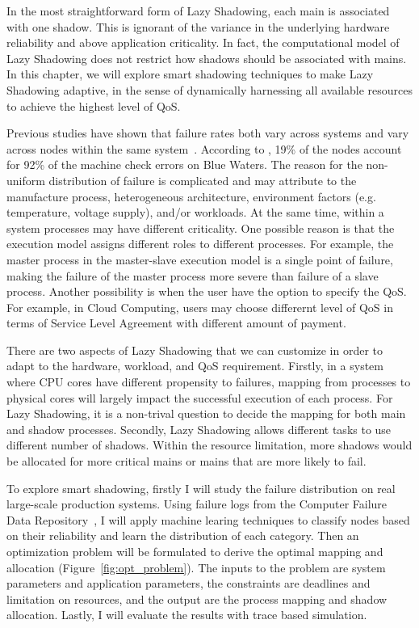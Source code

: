 In the most straightforward form of Lazy Shadowing, each main is associated with one shadow. This is ignorant of the variance in the underlying hardware reliability and above application criticality. In fact, the computational model of Lazy Shadowing does not restrict how shadows should be associated with mains. In this chapter, we will explore smart shadowing techniques to make Lazy Shadowing adaptive, in the sense of dynamically harnessing all available resources to achieve the highest level of QoS. 

Previous studies have shown that failure rates both vary across systems and vary across nodes within the same system~\cite{schroeder2007,di2014lessons}. According to \cite{di2014lessons}, 19\% of the nodes account for 92\% of the machine check errors on Blue Waters. The reason for the non-uniform distribution of failure is complicated and may attribute to the manufacture process, heterogeneous architecture, environment factors (e.g. temperature, voltage supply), and/or workloads. At the same time, within a system processes may have different criticality. One possible reason is that the execution model assigns different roles to different processes. For example, the master process in the master-slave execution model is a single point of failure, making the failure of the master process more severe than failure of a slave process. Another possibility is when the user have the option to specify the QoS. For example, in Cloud Computing, users may choose differernt level of QoS in terms of Service Level Agreement with different amount of payment. 

There are two aspects of Lazy Shadowing that we can customize in order to adapt to the hardware, workload, and QoS requirement. Firstly, in a system where CPU cores have different propensity to failures, mapping from processes to physical cores will largely impact the successful execution of each process. For Lazy Shadowing, it is a non-trival question to decide the mapping for both main and shadow processes. Secondly, Lazy Shadowing allows different tasks to use different number of shadows. Within the resource limitation, more shadows would be allocated for more critical mains or mains that are more likely to fail. 

To explore smart shadowing, firstly I will study the failure distribution on real large-scale production systems. Using failure logs from the Computer Failure Data Repository~\cite{cfdr}, I will apply machine learing techniques to classify nodes based on their reliability and learn the distribution of each category. Then an optimization problem will be formulated to derive the optimal mapping and allocation (Figure~\ref{fig:opt_problem}). The inputs to the problem are system parameters and application parameters, the constraints are deadlines and limitation on resources, and the output are the process mapping and shadow allocation. Lastly, I will evaluate the results with trace based simulation.

